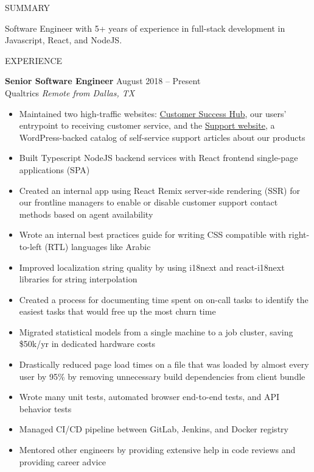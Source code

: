 \documentclass{resume} %
\begin{document}
\begin{rSection}{SUMMARY}

	{Software Engineer with 5+ years of experience in full-stack development in Javascript, React, and NodeJS.}

\end{rSection}


\begin{rSection}{EXPERIENCE}

	\textbf{Senior Software Engineer} \hfill August 2018 -- Present\\
	Qualtrics \hfill \textit{Remote from Dallas, TX}
	\begin{itemize}
		\itemsep -3pt {}
		\item Maintained two high-traffic websites: \href{https://support-portal.qualtrics.com/}{Customer Success Hub}, our users' entrypoint to receiving customer service, and the \href{https://www.qualtrics.com/support/}{Support website}, a WordPress-backed catalog of self-service support articles about our products
		\item Built Typescript NodeJS backend services with React frontend single-page applications (SPA)
		\item Created an internal app using React Remix server-side rendering (SSR) for our frontline managers to enable or disable customer support contact methods based on agent availability
		\item Wrote an internal best practices guide for writing CSS compatible with right-to-left (RTL) languages like Arabic
		\item Improved localization string quality by using i18next and react-i18next libraries for string interpolation
		\item Created a process for documenting time spent on on-call tasks to identify the easiest tasks that would free up the most churn time
		\item Migrated statistical models from a single machine to a job cluster, saving \$50k/yr in dedicated hardware costs
        \item Drastically reduced page load times on a file that was loaded by almost every user by 95\% by removing unnecessary build dependencies from client bundle
		\item Wrote many unit tests, automated browser end-to-end tests, and API behavior tests
		\item Managed CI/CD pipeline between GitLab, Jenkins, and Docker registry
		\item Mentored other engineers by providing extensive help in code reviews and providing career advice
	\end{itemize}
\end{rSection}
\end{document}
